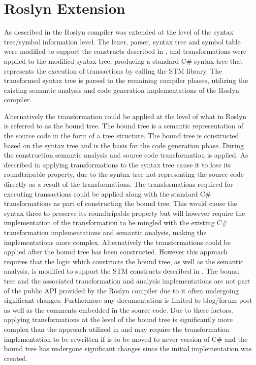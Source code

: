 \section{Roslyn Extension}\label{sec:reflection_roslyn_extension}
As described in  the Roslyn compiler was extended at the level of the syntax tree/symbol information level. The lexer, parser, syntax tree and symbol table were modified to support the constructs described in , and transformations were applied to the modified syntax tree, producing a standard C\# syntax tree that represents the execution of transactions by calling the \ac{STM} library. The transformed syntax tree is parsed to the remaining compiler phases, utilizing the existing semantic analysis and code generation implementations of the Roslyn compiler. 

Alternatively the transformation could be applied at the level of what in Roslyn is referred to as the bound tree. The bound tree is a semantic representation of the source code in the form of a tree structure. The bound tree is constructed based on the syntax tree and is the basis for the code generation phase. During the construction semantic analysis and source code transformation is applied. As described in  applying transformations to the syntax tree cause it to lose its roundtripable property, due to the syntax tree not representing the source code directly as a result of the transformations. The transformations required for executing transactions could be applied along with the standard C\# transformations as part of constructing the bound tree. This would cause the syntax three to preserve its roundtripable property but will however require the implementation of the transformation to be mingled with the existing C\# transformation implementations and semantic analysis, making the implementations more complex. Alternatively the transformations could be applied after the bound tree has been constructed. However this approach requires that the logic which constructs the bound tree, as well as the semantic analysis, is modified to support the \ac{STM} constructs described in . The bound tree and the associated transformation and analysis implementations are not part of the public \ac{API} provided by the Roslyn compiler due to it often undergoing significant changes\cite{roslynBinder}. Furthermore any documentation is limited to blog/forum post as well as the comments embedded in the source code. Due to these factors, applying transformations at the level of the bound tree is significantly more complex than the approach utilized in  and may require the transformation implementation to be rewritten if \stmname is to be moved to never version of C\# and the bound tree has undergone significant changes since the initial implementation was created.

